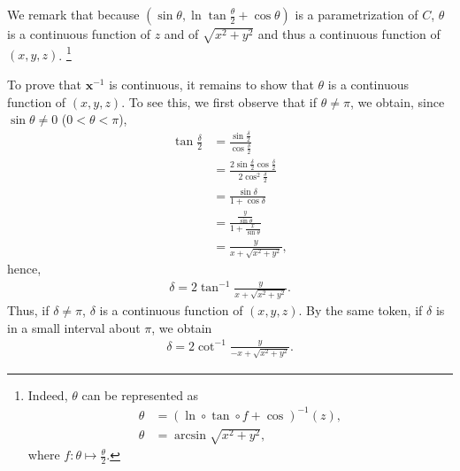 \documentclass[a4paper]{article}
\numberwithin{equation}{section}
\begin{document}
\begin{enumerate}
\begin{enumerate}
We remark that because $\left( {\sin \theta ,\ln \tan \frac{\theta }{2} + \cos \theta } \right)$ is a parametrization of $C$, $\theta$ is a continuous function of $z$ and of $\sqrt {{x^2} + {y^2}}$ and thus a continuous function of $\left(x,y,z\right)$. \footnote{Indeed, $\theta$ can be represented as
\begin{align}
\theta  &= {\left( {\ln  \circ \tan  \circ f + \cos } \right)^{ - 1}}\left( z \right),\\
\theta  &= \arcsin \sqrt {{x^2} + {y^2}} ,
\end{align}
where $f:\theta \mapsto \frac{\theta}{2}$.}

To prove that $\mathbf{x}^{-1}$ is continuous, it remains to show that $\theta$ is a continuous function of $\left(x,y,z\right)$. To see this, we first observe that if $\theta \ne \pi$, we obtain, since $\sin \theta  \ne 0$ ($0 <\theta <\pi$),
\begin{align}
\tan \frac{\delta }{2} &= \frac{{\sin \frac{\delta }{2}}}{{\cos \frac{\delta }{2}}}\\
& = \frac{{2\sin \frac{\delta }{2}\cos \frac{\delta }{2}}}{{2{{\cos }^2}\frac{\delta }{2}}}\\
& = \frac{{\sin \delta }}{{1 + \cos \delta }}\\
& = \frac{{\frac{y}{{\sin \theta }}}}{{1 + \frac{x}{{\sin \theta }}}}\\
 &= \frac{y}{{x + \sqrt {{x^2} + {y^2}} }},
\end{align}
hence,
\begin{align}
\delta  = 2{\tan ^{ - 1}}\frac{y}{{x + \sqrt {{x^2} + {y^2}} }}.
\end{align}
Thus, if $\delta \ne \pi$, $\delta$ is a continuous function of $\left(x,y,z\right)$. By the same token, if $\delta$ is in a small interval about $\pi$, we obtain
\begin{align}
\delta  = 2{\cot ^{ - 1}}\frac{y}{{ - x + \sqrt {{x^2} + {y^2}} }}.
\end{align}


\end{enumerate}
\end{enumerate}
\end{document}
